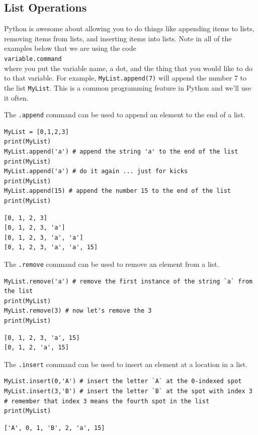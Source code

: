 \subsection{List Operations}
Python is awesome about allowing you to do things like appending items to lists, removing
items from lists, and inserting items into lists.  Note in all of the examples below that
we are using the code \\\texttt{variable.command}\\ where you put the variable name, a dot,
and the thing that you would like to do to that variable.  For example,
\texttt{MyList.append(7)} will append the number 7 to the list \texttt{MyList}.  This is a
common programming feature in Python and we'll use it often.

\begin{example}
    The \texttt{.append} command can be used to append an element to the end of a list.

    \bcode
\begin{lstlisting}
MyList = [0,1,2,3]
print(MyList)
MyList.append('a') # append the string 'a' to the end of the list
print(MyList)
MyList.append('a') # do it again ... just for kicks
print(MyList)
MyList.append(15) # append the number 15 to the end of the list
print(MyList)
\end{lstlisting}
\boutput
\begin{lstlisting}
[0, 1, 2, 3]
[0, 1, 2, 3, 'a']
[0, 1, 2, 3, 'a', 'a']
[0, 1, 2, 3, 'a', 'a', 15]
\end{lstlisting}
\end{example}

\begin{example}
    The \texttt{.remove} command can be used to remove an element from a list.

    \bcode
\begin{lstlisting}
MyList.remove('a') # remove the first instance of the string `a` from the list
print(MyList)
MyList.remove(3) # now let's remove the 3
print(MyList)
\end{lstlisting}
\boutput
\begin{lstlisting}
[0, 1, 2, 3, 'a', 15]
[0, 1, 2, 'a', 15]
\end{lstlisting}
\end{example}

\begin{example}
    The \texttt{.insert} command can be used to insert an element at a location in a list.

    \bcode
\begin{lstlisting}
MyList.insert(0,'A') # insert the letter `A` at the 0-indexed spot
MyList.insert(3,'B') # insert the letter `B` at the spot with index 3 
# remember that index 3 means the fourth spot in the list
print(MyList)
\end{lstlisting}
\boutput
\begin{lstlisting}
['A', 0, 1, 'B', 2, 'a', 15]
\end{lstlisting}
\end{example}

